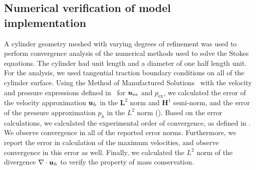 \documentclass{WileyMSP-template}
\begin{document}
\subsection{Numerical verification of model implementation}\label{subsec:numerical_verification}
A cylinder geometry meshed with varying degrees of refinement was used to
perform convergence analysis of the numerical methods used to solve the Stokes equations.
The cylinder had unit length and a diameter of one half length unit.
For the analysis, we used tangential traction boundary conditions on all
of the cylinder surface. Using the Method of Manufactured Solutions~\cite{Roache2001CodeSolutions}
with the velocity and pressure expressions defined in~
for $\bm{u}_{\mathrm{ex}}$ and $p_{\mathrm{ex}}$, we calculated the error of 
the velocity approximation $\bm{u}_h$
in the $\mathbf{L}^2$ norm and $\mathbf{H}^1$ semi-norm,
and the error of the pressure approximation $p_h$ in the $L^2$ norm ().
Based on the error calculations,
we calculated the experimental order of convergence,
as defined in .
We observe convergence in all of the reported error norms. Furthermore,
we report the error in calculation of the maximum velocities, and observe
convergence in this error as well. Finally, we calculated the $L^2$ norm of
the divergence $\nabla\cdot\bm{u}_h$ to verify the property of mass conservation.
\end{document}
